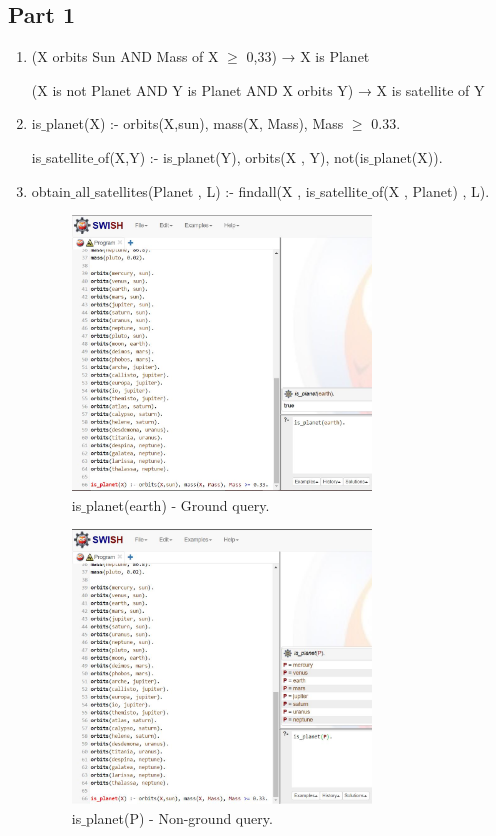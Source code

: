 \documentclass[12pt]{article}
\begin{document}
\subsection*{Part 1}
\begin{enumerate}
	
	\item (X orbits Sun AND Mass of X $\geq$ 0,33) → X is Planet
	
	(X is not Planet AND Y is Planet AND X orbits Y) → X is satellite of Y
	
	
	\item is$\_$planet(X) :- orbits(X,sun), mass(X, Mass), Mass $\geq$ 0.33. 
	
	is$\_$satellite$\_$of(X,Y) :- is$\_$planet(Y), orbits(X , Y), not(is$\_$planet(X)).
	
	\item obtain$\_$all$\_$satellites(Planet , L) :- findall(X , is$\_$satellite$\_$of(X , Planet) , L).

	\begin{figure}[htbp]
		\centering
		\includegraphics[width=0.75\textwidth]{is-planet_G.JPG}
		\caption{is$\_$planet(earth) - Ground query.}
	\end{figure}
	
	\begin{figure}[htbp]
		\centering
		\includegraphics[width=0.75\textwidth]{is-planet_NG.JPG}
		\caption{is$\_$planet(P) - Non-ground query.}
	\end{figure}
	

\end{enumerate}
\end{document}

